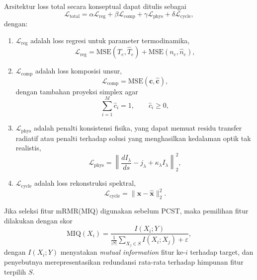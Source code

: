 Arsitektur loss total secara konseptual dapat ditulis sebagai
\begin{equation}
\mathcal{L}_{\mathrm{total}}
=
\alpha \mathcal{L}_{\mathrm{reg}}
+ \beta \mathcal{L}_{\mathrm{comp}}
+ \gamma \mathcal{L}_{\mathrm{phys}}
+ \delta \mathcal{L}_{\mathrm{cycle}},
\end{equation}
dengan:
\begin{enumerate}
    \item $\mathcal{L}_{\mathrm{reg}}$ adalah loss regresi untuk parameter termodinamika,
    \begin{equation}
    \mathcal{L}_{\mathrm{reg}}
    =
    \mathrm{MSE}(T_e,\hat{T}_e)
    +
    \mathrm{MSE}(n_e,\hat{n}_e),
    \end{equation}
    \item $\mathcal{L}_{\mathrm{comp}}$ adalah loss komposisi unsur,
    \begin{equation}
    \mathcal{L}_{\mathrm{comp}} = \mathrm{MSE}(\mathbf{c},\hat{\mathbf{c}}),
    \end{equation}
    dengan tambahan proyeksi simplex agar
    \begin{equation}
    \sum_{i=1}^{M}\hat{c}_i = 1, \qquad \hat{c}_i \ge 0,
    \end{equation}
    \item $\mathcal{L}_{\mathrm{phys}}$ adalah penalti konsistensi fisika, yang dapat memuat residu transfer radiatif atau penalti terhadap solusi yang menghasilkan kedalaman optik tak realistis,
    \begin{equation}
    \mathcal{L}_{\mathrm{phys}}
    =
    \left\|
    \frac{dI_\lambda}{ds} - j_\lambda + \kappa_\lambda I_\lambda
    \right\|_2^2,
    \end{equation}
    \item $\mathcal{L}_{\mathrm{cycle}}$ adalah loss rekonstruksi spektral,
    \begin{equation}
    \mathcal{L}_{\mathrm{cycle}} = \|\mathbf{x}-\hat{\mathbf{x}}\|_2^2 .
    \end{equation}
\end{enumerate}

Jika seleksi fitur mRMR(MIQ) digunakan sebelum PCST, maka pemilihan fitur dilakukan dengan skor
\begin{equation}
\mathrm{MIQ}(X_i)=
\frac{I(X_i;Y)}
{\frac{1}{|S|}\sum_{X_j\in S} I(X_i;X_j)+\varepsilon},
\end{equation}
dengan $I(X_i;Y)$ menyatakan \textit{mutual information} fitur ke-$i$ terhadap target, dan penyebutnya merepresentasikan redundansi rata-rata terhadap himpunan fitur terpilih $S$.

